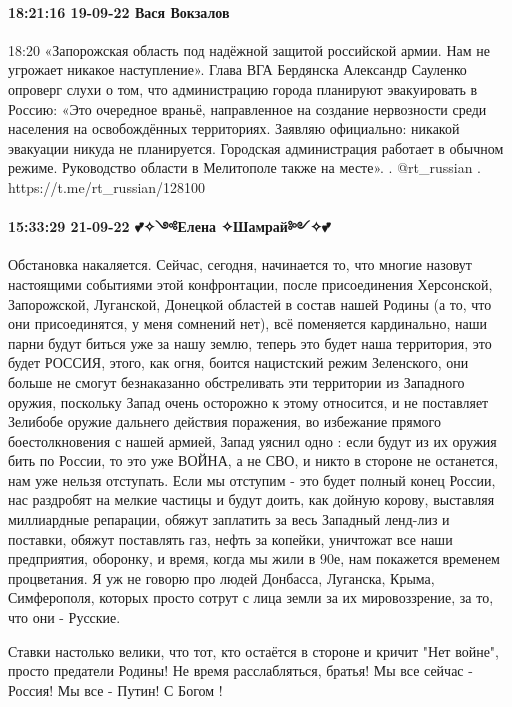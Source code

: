 \paragraph{18:21:16 19-09-22 Вася Вокзалов}
18:20
«Запорожская область под надёжной защитой российской армии. Нам не угрожает никакое наступление».
Глава ВГА Бердянска Александр Сауленко опроверг слухи о том, что администрацию города планируют эвакуировать в Россию:
«Это очередное враньё, направленное на создание нервозности среди населения на освобождённых территориях. Заявляю официально: никакой эвакуации никуда не планируется. Городская администрация работает в обычном режиме. Руководство области в Мелитополе также на месте».
.
@rt_russian
.
https://t.me/rt_russian/128100


\paragraph{15:33:29 21-09-22 💕✧༺Елена ✧Шамрай༻✧💕}

Обстановка накаляется. Сейчас, сегодня, начинается то, что многие назовут
настоящими событиями этой конфронтации, после присоединения Херсонской,
Запорожской, Луганской, Донецкой областей в состав нашей Родины (а то, что они
присоединятся, у меня сомнений нет), всё поменяется кардинально, наши парни
будут биться уже за нашу землю, теперь это будет наша территория, это будет
РОССИЯ, этого, как огня, боится нацистский режим Зеленского, они больше не
смогут безнаказанно обстреливать эти территории из Западного оружия, поскольку
Запад очень осторожно к этому относится, и не поставляет Зелибобе оружие
дальнего действия поражения, во избежание прямого боестолкновения с нашей
армией, Запад уяснил одно : если будут из их оружия бить по России, то это уже
ВОЙНА, а не СВО, и никто в стороне не останется, нам уже нельзя отступать. Если
мы отступим - это будет полный конец России, нас раздробят на мелкие частицы и
будут доить, как дойную корову, выставляя миллиардные репарации, обяжут
заплатить за весь Западный ленд-лиз и поставки, обяжут поставлять газ, нефть за
копейки, уничтожат все наши предприятия, оборонку, и время, когда мы жили в
90е, нам покажется временем процветания. Я уж не говорю про людей Донбасса,
Луганска, Крыма, Симферополя, которых просто сотрут с лица земли за их
мировоззрение, за то, что они - Русские.

Ставки настолько велики, что тот, кто остаётся в стороне и кричит "Нет войне",
просто предатели Родины! Не время расслабляться, братья! Мы все сейчас -
Россия! Мы все - Путин! С Богом !
